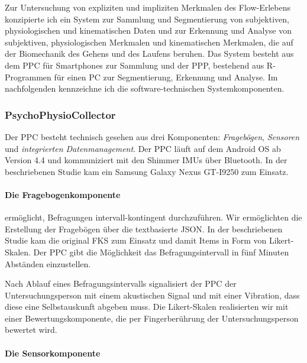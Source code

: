 Zur Untersuchung von expliziten und impliziten Merkmalen des Flow-Erlebens konzipierte ich ein System zur Sammlung und Segmentierung von subjektiven, physiologischen und kinematischen Daten und zur Erkennung und Analyse von subjektiven, physiologischen Merkmalen und kinematischen Merkmalen, die auf der Biomechanik des Gehens und des Laufens beruhen. Das System besteht aus dem \ac{PPC} für Smartphones zur Sammlung und der \ac{PPP}, bestehend aus R-Programmen für einen PC zur Segmentierung, Erkennung und Analyse. Im nachfolgenden kennzeichne ich die software-technischen Systemkomponenten.

\subsubsection{PsychoPhysioCollector} 

\label{ssub:psychophysiocollector}

Der \ac{PPC} besteht technisch gesehen aus drei Komponenten: \emph{Fragebögen}, \emph{Sensoren} und \emph{integrierten Datenmanagement}. Der \ac{PPC} läuft auf dem Android OS ab Version 4.4 und kommuniziert mit den Shimmer \acp{IMU} über Bluetooth. In der beschriebenen Studie kam ein Samsung Galaxy Nexus GT-I9250 zum Einsatz.

\paragraph{Die Fragebogenkomponente} 

\label{par:die_fragebogenkomponente}

ermöglicht, Befragungen intervall-kontingent durchzuführen. Wir ermöglichten die Erstellung der Fragebögen über die textbasierte JSON. In der beschriebenen Studie kam die original \ac{FKS} zum Einsatz und damit Items in Form von Likert-Skalen. Der \ac{PPC} gibt die Möglichkeit das Befragungsintervall in fünf Minuten Abständen einzustellen.

Nach Ablauf eines Befragungsintervalls signalisiert der \ac{PPC} der Untersuchungsperson mit einem akustischen Signal und mit einer Vibration, dass diese eine Selbstauskunft abgeben muss. Die Likert-Skalen realisierten wir mit einer Bewertungskomponente, die per Fingerberührung der Untersuchungsperson bewertet wird.

\paragraph{Die Sensorkomponente} 

